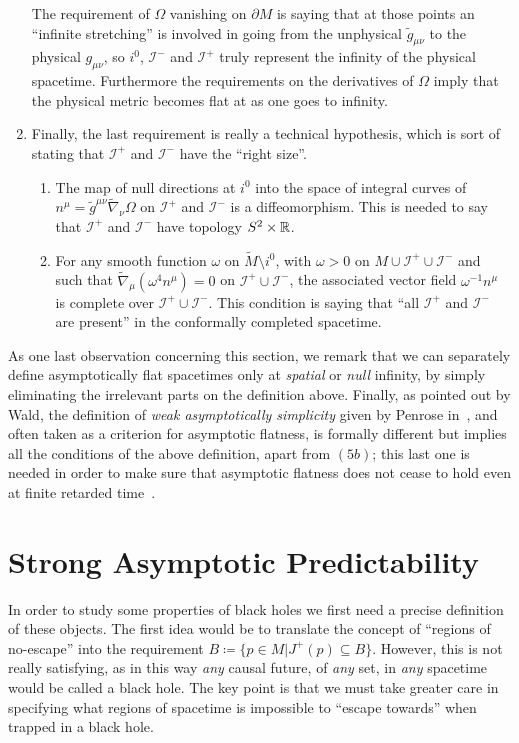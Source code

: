 \begin{definition}
\begin{enumerate}[label=(\arabic*)]
			The requirement of \(\Omega\) vanishing on \(\partial M\) is saying that at those points an ``infinite stretching'' is involved in going from the unphysical \(\tilde{g}_{\mu\nu}\) to the physical \(g_{\mu\nu}\), so \(i^0\), \(\mathscr{I}^-\) and \(\mathscr{I}^+\) truly represent the infinity of the physical spacetime. Furthermore the requirements on the derivatives of \(\Omega\) imply that the physical metric becomes flat at as one goes to infinity.
		\item Finally, the last requirement is really a technical hypothesis, which is sort of stating that \(\mathscr{I}^+\) and \(\mathscr{I}^-\) have the ``right size''.
		\begin{enumerate}
			\item The map of null directions at \(i^0\) into the space of integral curves of \(n^{\mu} = \tilde{g}^{\mu\nu} \tilde{\nabla}_{\nu}\Omega\) on  \(\mathscr{I}^+\) and \(\mathscr{I}^-\) is a diffeomorphism. This is needed to say that \(\mathscr{I}^+\) and \(\mathscr{I}^-\) have topology \(S^2\times{\mathbb{R}}\).
			\item For any smooth function \(\omega\) on \(\tilde{M} \setminus i^0\), with \(\omega > 0\) on \(M \cup \mathscr{I}^+ \cup \mathscr{I}^- \) and such that \(\tilde{\nabla}_{\mu}(\omega^4n^{\mu}) = 0\) on \(\mathscr{I}^+ \cup \mathscr{I}^-\), the associated vector field \(\omega^{-1}n^{\mu}\) is complete over \(\mathscr{I}^+ \cup \mathscr{I}^-\). This condition is saying that ``all \(\mathscr{I}^+\) and \(\mathscr{I}^-\) are present'' in the conformally completed spacetime.
			\end{enumerate}
	\end{enumerate}
\end{definition}

As one last observation concerning this section, we remark that we can separately define asymptotically flat spacetimes only at \emph{spatial} or \emph{null} infinity, by simply eliminating the irrelevant parts on the definition above.
Finally, as pointed out by Wald, the definition of \emph{weak asymptotically simplicity} given by Penrose in~\cite{penrose1965zero}, and often taken as a criterion for asymptotic flatness, is formally different but implies all the conditions of the above definition, apart from \((5b)\); this last one is needed in order to make sure that asymptotic flatness does not cease to hold even at finite retarded time~\cite{geroch1978asymptotically}.

\section{Strong Asymptotic Predictability}
In order to study some properties of black holes we first need a precise definition of these objects. The first idea would be to translate the concept of ``regions of no-escape'' into the requirement \(B \coloneqq \{p \in M\vert J^+(p)\subseteq B \}\).
However, this is not really satisfying, as in this way \emph{any} causal future, of \emph{any} set, in \emph{any} spacetime would be called a black hole. The key point is that we must take greater care in specifying what regions of spacetime is impossible to ``escape towards'' when trapped in a black hole.

